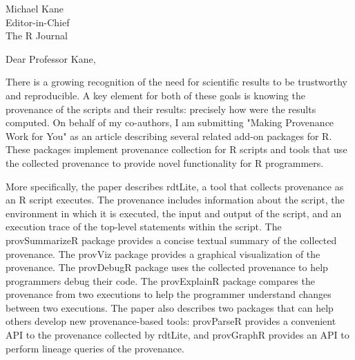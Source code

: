 \documentclass[10pt]{letter} %
\begin{document}

\begin{letter}{Michael Kane \\ Editor-in-Chief \\ The R Journal} %


\opening{Dear Professor Kane,}


There is a growing recognition of the need for scientific results to be trustworthy and reproducible.  A key element for both of these goals is knowing the provenance of the scripts and their results:  precisely how were the results computed.  On behalf of my co-authors, I am submitting "Making Provenance Work for You" as an article describing several related add-on packages for R.  These packages implement provenance collection for R scripts and tools that use the collected provenance to provide novel functionality for R programmers. 

More specifically, the paper describes rdtLite, a tool that collects provenance as an R script executes.  The provenance includes information about the script, the environment in which it is executed, the input and output of the script, and an execution trace of the top-level statements within the script.  The provSummarizeR package provides a concise textual summary of the collected provenance.  The provViz package provides a graphical visualization of the provenance.  The provDebugR package uses the collected provenance to help programmers debug their code.  The provExplainR package compares the provenance from two executions to help the programmer understand changes between two executions.  The paper also describes two packages that can help others develop new provenance-based tools: provParseR provides a convenient API to the provenance collected by rdtLite, and provGraphR provides an API to perform lineage queries of the provenance.


\end{letter}
\end{document}
